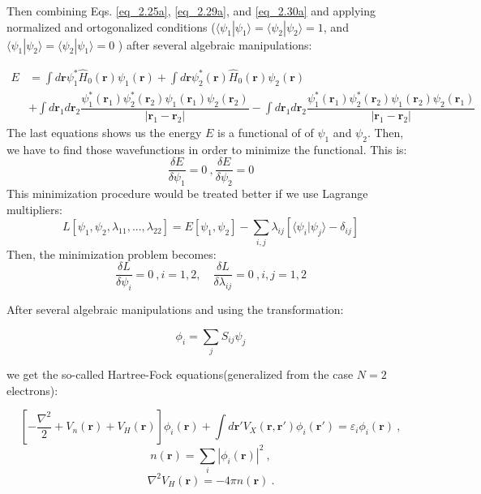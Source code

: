 Then combining Eqs. \ref{eq_2.25a}, \ref{eq_2.29a}, and \ref{eq_2.30a} and applying normalized and ortogonalized conditions ($\langle \psi_1 | \psi_1 \rangle = \langle \psi_2 | \psi_2 \rangle = 1$, and $\langle \psi_1 | \psi_2 \rangle = \langle \psi_2 | \psi_1 \rangle = 0$ ) after several algebraic manipulations:

\begin{align*}
	E & = \int d \mathbf{r} \psi_{1}^{*} \hat{H}_{0}(\mathbf{r})\psi_{1}(\mathbf{r}) + \int d \mathbf{r} \psi_{2}^{*} (\mathbf{r}) \hat{H}_{0}(\mathbf{r}) \psi_2(\mathbf{r}) \\
	& + \int d \mathbf{r}_{1} d \mathbf{r}_{2} \dfrac{\psi_{1}^{*}(\mathbf{r}_{1})\psi_{2}^{*}(\mathbf{r}_{2})\psi_{1}(\mathbf{r}_{1})\psi_{2}(\mathbf{r}_{2})}{|\mathbf{r}_1-\mathbf{r}_2|} -  \int d \mathbf{r}_{1} d \mathbf{r}_{2} \dfrac{\psi_{1}^{*}(\mathbf{r}_{1})\psi_{2}^{*}(\mathbf{r}_{2})\psi_{1}(\mathbf{r}_{2})\psi_{2}(\mathbf{r}_{1})}{|\mathbf{r}_1-\mathbf{r}_2|} 
\end{align*}
The last equations shows us the energy $E$ is a functional of of $\psi_1$ and $\psi_2$. Then, we have to find those wavefunctions in order to minimize the functional. This is:
\begin{equation}
	\dfrac{\delta E}{\delta \psi_{1}} =0 \ , \dfrac{\delta E}{\delta \psi_{2}} = 0
\end{equation}
This minimization procedure would be treated better if we use Lagrange multipliers:
\begin{equation}
	L\left[\psi_{1}, \psi_{2}, \lambda_{11}, ..., \lambda_{22} \right] = E[\psi_{1}, \psi_{2}] - \sum_{i,j} \lambda_{ij} \left[\langle \psi_{i} | \psi_{j}\rangle  - \delta_{ij}\right]
\end{equation}
Then, the minimization problem becomes:
\begin{equation}
	\dfrac{\delta L}{\delta \psi_{i}} = 0 \ , i=1, 2, \quad \dfrac{\delta L}{\delta \lambda_{ij}} = 0 \ , i,j=1, 2
\end{equation}

After several algebraic manipulations and using the transformation:

\begin{equation}
	\phi_i = \sum_{j} S_{ij} \psi_{j}
\end{equation}

we get the so-called Hartree-Fock equations(generalized from the case $N=2$ electrons):

\begin{equation}
	\left[- \dfrac{\nabla^{2}}{2} + V_{n}(\mathbf{r}) + V_{H} (\mathbf{r}) \right] \phi_{i} (\mathbf{r}) + \int d \mathbf{r}' V_{X}(\mathbf{r},\mathbf{r}') \phi_{i} (\mathbf{r}') = \varepsilon_{i} \phi_{i} (\mathbf{r}) \ ,
\end{equation}
\begin{equation}
	n(\mathbf{r}) = \sum_{i} |\phi_{i}(\mathbf{r})|^{2} \ ,
\end{equation}
\begin{equation}
	\nabla^{2} V_{H} (\mathbf{r}) = -4 \pi n (\mathbf{r}) \ .
\end{equation} 


